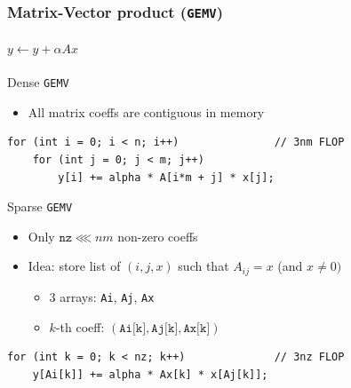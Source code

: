 \documentclass[xcolor={x11names,svgnames},x11names,svgnames]{beamer}
\begin{document}

\begin{frame}[fragile]
  \frametitle{Matrix-Vector product (\texttt{GEMV})}
  \framesubtitle{$y \gets y + \alpha Ax$}
  \begin{alertblock}{Dense \texttt{GEMV}}
    \begin{itemize}
    \item All matrix coeffs are contiguous in memory
    \end{itemize}
    \begin{verbatim}
for (int i = 0; i < n; i++)               // 3nm FLOP
    for (int j = 0; j < m; j++)
        y[i] += alpha * A[i*m + j] * x[j]; 
      \end{verbatim}
    \end{alertblock}
  
  \begin{exampleblock}{Sparse \texttt{GEMV}}
    \begin{itemize}
      \item Only $\texttt{nz} \lll nm$ non-zero coeffs
      \item Idea: store list of $(i, j, x)$ such that $A_{ij} = x$ (and $x \neq 0)$
        \begin{itemize}
        \item 3 arrays: \texttt{Ai}, \texttt{Aj}, \texttt{Ax}
        \item $k$-th coeff: $(\texttt{Ai[k]}, \texttt{Aj[k]}, \texttt{Ax[k]})$
        \end{itemize}
      \end{itemize}
      \begin{verbatim}
for (int k = 0; k < nz; k++)              // 3nz FLOP
    y[Ai[k]] += alpha * Ax[k] * x[Aj[k]]; 
    \end{verbatim}
  \end{exampleblock}
\end{frame}

\end{document}
